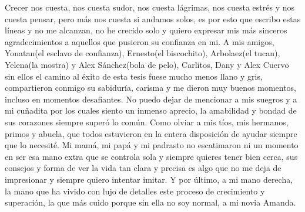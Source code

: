 \begin{acknowledgements}
    
\end{acknowledgements}


Crecer nos cuesta, nos cuesta sudor, nos cuesta lágrimas, nos cuesta estrés y nos cuesta pensar, pero más nos cuesta si andamos solos, es por esto que escribo 
estas líneas y no me alcanzan, no he crecido solo y quiero expresar mis más sinceros agradecimientos a aquellos que pusieron su confianza en mi. A mis amigos, 
Yonatan(el esclavo de confianza), Ernesto(el biscochito), Arbolaez(el tucan), Yelena(la mostra) y Alex Sánchez(bola de pelo), Carlitos, Dany y Alex Cuervo sin 
ellos el camino al éxito de esta tesis fuese mucho menos llano y gris, compartieron conmigo su sabiduría, carisma y me dieron muy buenos momentos, incluso en 
momentos desafiantes. No puedo dejar de mencionar a mis suegros y a mi cuñadita por los cuales siento un inmenso aprecio, la amabilidad y bondad de sus corazones 
siempre superó lo común. Como olviar a mis tíos, mis hermanos, primos y abuela, que todos estuvieron en la entera disposición de ayudar siempre que lo necesité. 
Mi mamá, mi papá y mi padrasto no escatimaron ni un momento en ser esa mano extra que se controla sola y siempre quieres tener bien cerca, sus consejos y forma de 
ver la vida tan clara y precisa es algo que no me deja de impresionar y siempre quiero intentar imitar. Y por último, a mi mano derecha, la mano que ha vivido 
con lujo de detalles este proceso de crecimiento y superación, la que más cuido porque sin ella no soy normal, a mi novia Amanda.
